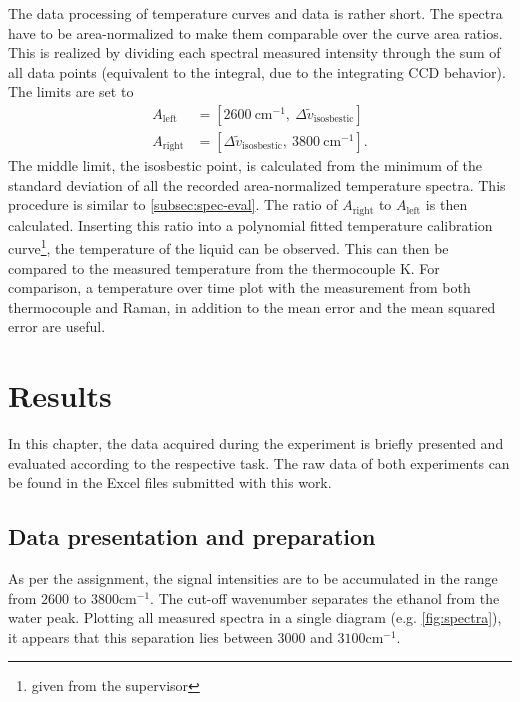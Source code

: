 The data processing of temperature curves and data is rather short. The spectra have to be area-normalized to make them comparable over the curve area ratios. This is realized by dividing each spectral measured intensity through the sum of all data points (equivalent to the integral, due to the integrating CCD behavior). The limits are set to
\begin{align}
    A_\mathrm{left}&= [2600~\mathrm{cm^{-1}},~\Delta \tilde{v}_\mathrm{isosbestic}]\nonumber \\
    A_\mathrm{right}&= [\Delta \tilde{v}_\mathrm{isosbestic},~3800~\mathrm{cm^{-1}}]\nonumber .
\end{align}
The middle limit, the isosbestic point, is calculated from the minimum of the standard deviation of all the recorded area-normalized temperature spectra. This procedure is similar to \autoref{subsec:spec-eval}. The ratio of $A_\mathrm{right}$ to $A_\mathrm{left}$ is then calculated. Inserting this ratio into a polynomial fitted temperature calibration curve\footnote{given from the supervisor}, the temperature of the liquid can be observed. This can then be compared to the measured temperature from the thermocouple K. For comparison, a temperature over time plot with the measurement from both thermocouple and Raman, in addition to the mean error and the mean squared error are useful.

\chapter{Results}
\label{chap:results}

In this chapter, the data acquired during the experiment is briefly presented and evaluated according to the respective task. The raw data of both experiments can be found in the Excel files submitted with this work.

\section{Data presentation and preparation}

\label{subsec:spec-prep}

As per the assignment, the signal intensities are to be accumulated in the range from $2600$ to $3800 \mathrm{cm^{-1}}$. The cut-off wavenumber separates the ethanol from the water peak. Plotting all measured spectra in a single diagram (e.g. \autoref{fig:spectra}), it appears that this separation lies between $3000$ and $3100 \mathrm{cm^{-1}}$.

